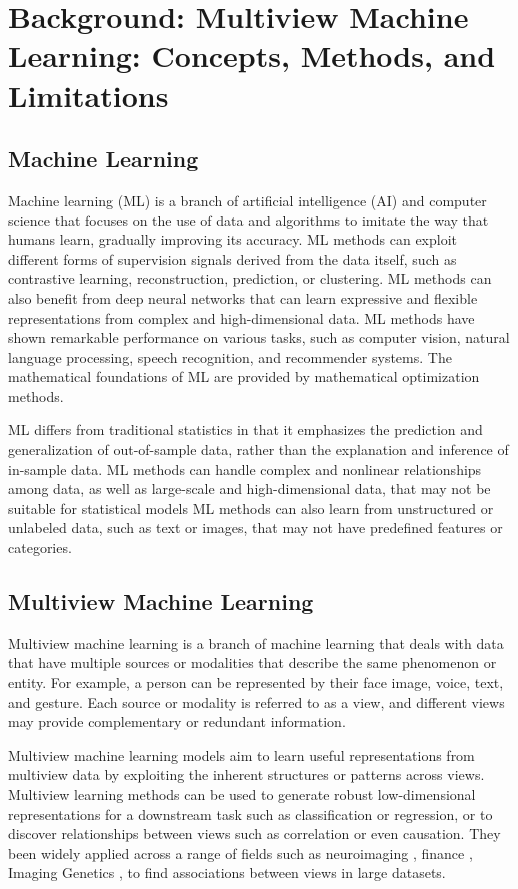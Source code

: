 \chapter{Background: Multiview Machine Learning: Concepts, Methods, and Limitations}\label{chap:background}

\section{Machine Learning}

Machine learning (ML) is a branch of artificial intelligence (AI) and computer science that focuses on the use of data and algorithms to imitate the way that humans learn, gradually improving its accuracy. ML methods can exploit different forms of supervision signals derived from the data itself, such as contrastive learning, reconstruction, prediction, or clustering. ML methods can also benefit from deep neural networks that can learn expressive and flexible representations from complex and high-dimensional data. ML methods have shown remarkable performance on various tasks, such as computer vision, natural language processing, speech recognition, and recommender systems. The mathematical foundations of ML are provided by mathematical optimization methods.

ML differs from traditional statistics in that it emphasizes the prediction and generalization of out-of-sample data, rather than the explanation and inference of in-sample data. ML methods can handle complex and nonlinear relationships among data, as well as large-scale and high-dimensional data, that may not be suitable for statistical models ML methods can also learn from unstructured or unlabeled data, such as text or images, that may not have predefined features or categories.

\section{Multiview Machine Learning}

Multiview machine learning is a branch of machine learning that deals with data that have multiple sources or modalities that describe the same phenomenon or entity. For example, a person can be represented by their face image, voice, text, and gesture. Each source or modality is referred to as a view, and different views may provide complementary or redundant information.

Multiview machine learning models aim to learn useful representations from multiview data by exploiting the inherent structures or patterns across views. Multiview learning methods can be used to generate robust low-dimensional representations for a downstream task such as classification or regression, or to discover relationships between views such as correlation or even causation. They been widely applied across a range of fields such as neuroimaging \cite{Krishnan2011}, finance \cite{cassel2000measurement}, Imaging Genetics \cite{Hansen2021}, to find associations between views in large datasets.



